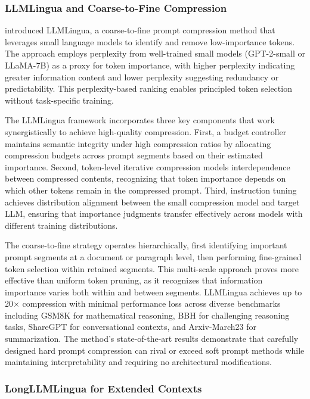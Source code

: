 \subsubsection{LLMLingua and Coarse-to-Fine Compression}

\citet{jiang2023llmlingua} introduced LLMLingua, a coarse-to-fine prompt compression method that leverages small language models to identify and remove low-importance tokens. The approach employs perplexity from well-trained small models (GPT-2-small or LLaMA-7B) as a proxy for token importance, with higher perplexity indicating greater information content and lower perplexity suggesting redundancy or predictability. This perplexity-based ranking enables principled token selection without task-specific training.

The LLMLingua framework incorporates three key components that work synergistically to achieve high-quality compression. First, a budget controller maintains semantic integrity under high compression ratios by allocating compression budgets across prompt segments based on their estimated importance. Second, token-level iterative compression models interdependence between compressed contents, recognizing that token importance depends on which other tokens remain in the compressed prompt. Third, instruction tuning achieves distribution alignment between the small compression model and target LLM, ensuring that importance judgments transfer effectively across models with different training distributions.

The coarse-to-fine strategy operates hierarchically, first identifying important prompt segments at a document or paragraph level, then performing fine-grained token selection within retained segments. This multi-scale approach proves more effective than uniform token pruning, as it recognizes that information importance varies both within and between segments. LLMLingua achieves up to 20$\times$ compression with minimal performance loss across diverse benchmarks including GSM8K for mathematical reasoning, BBH for challenging reasoning tasks, ShareGPT for conversational contexts, and Arxiv-March23 for summarization. The method's state-of-the-art results demonstrate that carefully designed hard prompt compression can rival or exceed soft prompt methods while maintaining interpretability and requiring no architectural modifications.

\subsubsection{LongLLMLingua for Extended Contexts}

